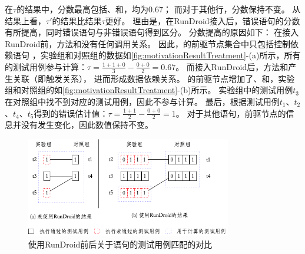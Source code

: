 在$\tau$的结果中，分数最高包括、和，均为0.67；
而对于其他行，分数保持不变。
从结果上看，$\tau'$的结果比结果$\tau$更好。
理由是，在RunDroid接入后，错误语句的分数有所提高，同时错误语句与非错误语句得到区分。
 分数提高的原因如下：
在接入RunDroid前，方法和没有任何调用关系。
因此，的前驱节点集合中只包括控制依赖语句 ，实验组和对照组的数据如\autoref{fig:motivationResultTreatment}-(a)所示，所有的测试用例参与计算：$\tau= \frac{1+1+0	}{3} - \frac{0+0}{2} = 0.67$。
而接入RunDroid后，方法和产生关联（即触发关系），
进而形成数据依赖关系。
的前驱节点增加了、和，实验组和对照组的如\autoref{fig:motivationResultTreatment}-(b)所示。
实验组中的测试用例$t_3$在对照组中找不到对应的测试用例，因此不参与计算。
最后，根据测试用例$t_1$、$t_2$、$t_4$、$t_5$得到的错误估计值：$\tau =  \frac{1+1	}{2} - \frac{0+0}{2} = 1$。
对于其他语句，前驱节点的信息并没有发生变化，因此数值保持不变。


\begin{figure}[!h]
		\begin{center}
	\includegraphics[width=0.8\textwidth]{./Figures/treatment.png}
\end{center}
	\caption{使用RunDroid前后关于语句的测试用例匹配的对比}
	\label{fig:motivationResultTreatment}
\end{figure}


